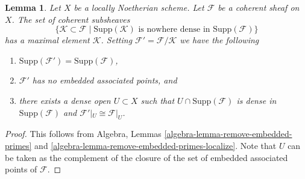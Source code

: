 \documentclass[10pt,a4paper]{amsart}
\theoremstyle{plain}
\newtheorem{lemma}[subsection]{Lemma}
\theoremstyle{definition}
\theoremstyle{remark}
\numberwithin{equation}{subsection}
\begin{document}
\begin{lemma}
\label{lemma-remove-embedded-points}
Let $X$ be a locally Noetherian scheme.
Let $\mathcal{F}$ be a coherent sheaf on $X$.
The set of coherent subsheaves
$$
\{
\mathcal{K} \subset \mathcal{F}
\mid
\text{Supp}(\mathcal{K})\text{ is nowhere dense in }\text{Supp}(\mathcal{F})
\}
$$
has a maximal element $\mathcal{K}$.
Setting $\mathcal{F}' = \mathcal{F}/\mathcal{K}$ we have the
following
\begin{enumerate}
\item $\text{Supp}(\mathcal{F}') = \text{Supp}(\mathcal{F})$,
\item $\mathcal{F}'$ has no embedded associated points, and
\item there exists a dense open $U \subset X$ such that
$U \cap \text{Supp}(\mathcal{F})$ is dense in $\text{Supp}(\mathcal{F})$
and $\mathcal{F}'|_U \cong \mathcal{F}|_U$.
\end{enumerate}
\end{lemma}

\begin{proof}
This follows from
Algebra, Lemmas \ref{algebra-lemma-remove-embedded-primes} and
\ref{algebra-lemma-remove-embedded-primes-localize}.
Note that $U$ can be taken as the complement of the closure
of the set of embedded associated points of $\mathcal{F}$.
\end{proof}
\end{document}
